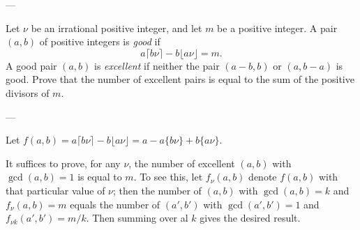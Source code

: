 
---

Let $\nu$ be an irrational positive integer, and let $m$ be a positive integer. A pair $(a,b)$ of positive integers is \emph{good} if \[a\lceil b\nu\rceil-b\lfloor a\nu\rfloor=m.\]
A good pair $(a,b)$ is \emph{excellent} if neither the pair $(a-b,b)$ or $(a,b-a)$ is good. Prove that the number of excellent pairs is equal to the sum of the positive divisors of $m$.

---

Let $f(a,b)=a\lceil b\nu\rceil-b\lfloor a\nu\rfloor=a-a\{b\nu\}+b\{a\nu\}$.

It suffices to prove, for any $\nu$, the number of excellent $(a,b)$ with $\gcd(a,b)=1$ is equal to $m$. To see this, let $f_\nu(a,b)$ denote $f(a,b)$ with that particular value of $\nu$; then the number of $(a,b)$ with $\gcd(a,b)=k$ and $f_\nu(a,b)=m$ equals the number of $(a',b')$ with $\gcd(a',b')=1$ and $f_{\nu k}(a',b')=m/k$. Then summing over al $k$ gives the desired result.

